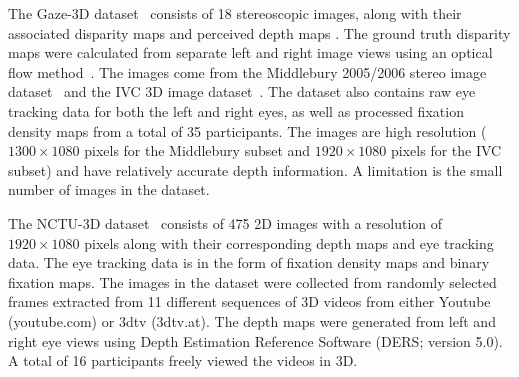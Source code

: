 \documentclass[12pt]{article}
\begin{document}
The Gaze-3D dataset~\citep{Wang_etal13} consists of 18 stereoscopic
images, along with their associated disparity maps and perceived depth maps
\cite[perceived depth is computed from raw disparity by taking into
account viewing distance and display properties; see][for
details]{Wang_etal13}. The ground truth disparity maps were calculated
from separate left and right image views using an optical flow
method~\citep{Werlberger_etal09}. The images come from the Middlebury
2005/2006 stereo image dataset~\citep{Scharstein_Pal07} and the IVC
3D image dataset~\citep{Urvoy_etal12}. The dataset also contains raw
eye tracking data for both the left and right eyes, as well as
processed fixation density maps from a total of 35 participants. The images are high resolution ($1300\times1080$ pixels for the Middlebury
subset and $1920\times1080$ pixels for the IVC subset) and have relatively
accurate depth information. A limitation is the small number of images
in the dataset.

The NCTU-3D dataset~\citep{Ma_Hang15} consists of 475 2D
images with a resolution of $1920\times1080$ pixels along with their
corresponding depth maps and eye tracking data. The eye tracking data
is in the form of fixation density maps and binary fixation maps. The
images in the dataset were collected from randomly selected frames
extracted from 11 different sequences of 3D videos from either Youtube
(youtube.com) or 3dtv (3dtv.at).
The depth maps were generated from left and right eye views using
Depth Estimation Reference Software (DERS; version 5.0). A total of 16
participants freely viewed the videos in 3D.
\end{document}
